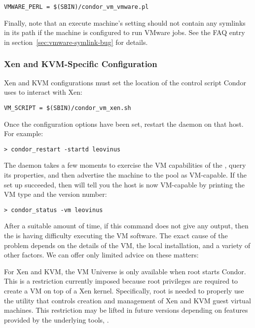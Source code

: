 \begin{verbatim}
VMWARE_PERL = $(SBIN)/condor_vm_vmware.pl
\end{verbatim}

Finally, note that an execute machine's  setting should not
contain any symlinks in its path if the machine is configured to run VMware
jobs. See the FAQ entry in section~\ref{sec:vmware-symlink-bug} for details.

\subsubsection{Xen and KVM-Specific Configuration}

Xen and KVM configurations must set the location of the control script Condor
uses to interact with Xen:

\begin{verbatim}
VM_SCRIPT = $(SBIN)/condor_vm_xen.sh
\end{verbatim}


Once the configuration options have been set, restart the  
daemon on that host.  For example:

\begin{verbatim}
> condor_restart -startd leovinus
\end{verbatim}

The  daemon takes a few moments to exercise the VM
capabilities of the , query its properties, and then 
advertise the machine to the pool as VM-capable.  If the set up 
succeeded, then  will tell you the host is now 
VM-capable by printing the VM type and the version number:

\begin{verbatim}
> condor_status -vm leovinus
\end{verbatim}

After a suitable amount of time, if this command does not give any output,
then the  is having difficulty executing the VM software.
The exact cause of the problem depends on the details of the VM, the local 
installation, and a variety of other factors. We can offer only limited 
advice on these matters:

For Xen and KVM, the VM Universe is only available when root starts Condor.
This is a restriction currently imposed because root privileges are 
required to create a VM on top of a Xen kernel. Specifically, root is needed 
to properly use the  utility that controls 
creation and management of Xen and KVM guest virtual machines. This restriction 
may be lifted in future versions depending on features provided by the 
underlying tools, .

